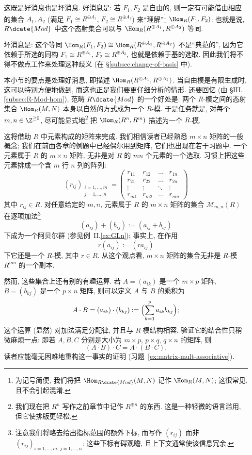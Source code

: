 这既是好消息也是坏消息. 好消息是: 若 $F_1,F_2$ 是自由的, 则一定有可能借由相应的集合 $A_1,A_2$ (满足 $F_1\cong R^{\oplus A_1}$, $F_2\cong R^{\oplus A_2}$) 来``理解''\footnote{为记号简便, 我们将把 $\Hom_{R\dcate{Mod}}(M,N)$ 记作 $\Hom_R(M,N)$; 这很常见, 且不会引起混淆.} $\Hom_R(F_1,F_2)$: 也就是说, $R\dcate{Mod}$ 中这个态射集合可以与 $\Hom_R(R^{\oplus A_1},R^{\oplus A_2})$ 等同.

坏消息是: 这个等同 $\Hom_R(F_1,F_2)\cong\Hom_R(R^{\oplus A_1},R^{\oplus A_2})$ 不是``典范的'', 因为它依赖于所选的同构 $F_1\cong R^{\oplus A_1}$, $F_2\cong R^{\oplus A_2}$, 也就是依赖于基的选取. 因此我们将不得不做点工作来处理这种歧义 (在 §\ref{subsec:change-of-basis} 中).

本小节的要点是处理好消息, 即描述 $\Hom_R(R^{\oplus A_1},R^{\oplus A_2})$. 当自由模是有限生成时, 这可以特别方便地做到, 而这也正是我们要更仔细分析的情形. 还要回忆 (由 §III.\ref{subsec:R-Mod-hom}), 范畴 $R\dcate{Mod}$ 的一个好处是: 两个 $R$-模之间的态射集合 $\Hom_R(M,N)$ 本身以自然的方式成为一个 $R$-模. 于是任务就是, 对每个 $m,n\in\Z^{\ge0}$, 尽可能显式地\footnote{我们现在把 $R^n$ 写作之前章节中记作 $R^{\oplus n}$ 的东西. 这是一种轻微的语言滥用, 但它使排版更轻松.} 把 $\Hom_R(R^n,R^m)$ 描述为一个 $R$-模.

这将借助 $R$ 中元素构成的矩阵来完成. 我们相信读者已经熟悉 $m\times n$ 矩阵的一般概念; 我们在前面各章的例题中已经偶尔用到矩阵, 它们也出现在若干习题中. 一个元素属于 $R$ 的 $m\times n$ 矩阵, 无非是对 $R$ 的 $mn$ 个元素的一个选取. 习惯上把这些元素排成一个含 $m$ 行 $n$ 列的阵列:
\[
(r_{ij})_{\substack{i=1,\dots,m\\ j=1,\dots,n}} = \begin{pmatrix}
r_{11} & r_{12} & \dots & r_{1n}\\
r_{21} & r_{22} & \dots & r_{2n}\\
\vdots & \vdots & \ddots & \vdots\\
r_{m1} & r_{m2} & \dots & r_{mn}
\end{pmatrix}
\]
其中 $r_{ij}\in R$. 对任意给定的 $m,n$, 元素属于 $R$ 的 $m\times n$ 矩阵的集合 $\mathcal{M}_{m,n}(R)$ 在逐项加法\footnote{注意我们将略去给出指标范围的额外下标, 而写作 $(r_{ij})$ 而非 $(r_{ij})_{i=1,\dots,m;\,j=1,\dots,n}$: 这些下标有碍观瞻, 且上下文通常使该信息冗余.}
\[
(a_{ij})+(b_{ij}) := (a_{ij}+b_{ij})
\]
下成为一个阿贝尔群 (参见例~II.\ref{ex:GLn}); 事实上, 在作用
\[
r(a_{ij}) := (r a_{ij})
\]
下它还是一个 $R$-模, 其中 $r\in R$. 从这个观点看, $m\times n$ 矩阵的集合无非是 $R$-模 $R^{mn}$ 的一个副本.

然而, 这些集合上还有别的有趣运算. 若 $A=(a_{ik})$ 是一个 $m\times p$ 矩阵, $B=(b_{kj})$ 是一个 $p\times n$ 矩阵, 则可以定义 $A$ 与 $B$ 的乘积为
\[
A\cdot B = (a_{ik})\cdot(b_{kj}) := \Bigl(\sum_{k=1}^{p} a_{ik}b_{kj}\Bigr);
\]
这个运算 (显然) 对加法满足分配律, 并且与 $R$-模结构相容. 验证它的结合性只稍微麻烦一点: 即若 $A,B,C$ 分别是大小为 $m\times p$, $p\times q$, $q\times n$ 的矩阵, 则
\[
(A\cdot B)\cdot C = A\cdot(B\cdot C).
\]
读者应能毫无困难地重构这一事实的证明 (习题~\ref{ex:matrix-mult-associative}).

